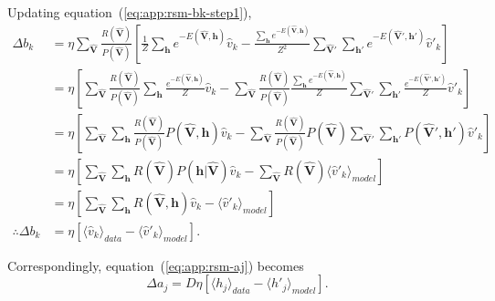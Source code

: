 Updating equation~(\ref{eq:app:rsm-bk-step1}),
\begin{align}
    \Delta b_{k} &= \eta \sum_{\mathbf{\hat{V}}} \frac{R(\mathbf{\hat{V}})}{P(\mathbf{\hat{V}})} \left[ \frac{1}{Z} \sum_{\mathbf{h}} e^{-E(\mathbf{\hat{V}}, \mathbf{h})} \hat{v}_{k} - \frac{\sum_{\mathbf{h}} e^{-E(\mathbf{\hat{V}}, \mathbf{h})}}{Z^{2}} \sum_{\mathbf{\hat{V}}'} \sum_{\mathbf{h}'} e^{-E(\mathbf{\hat{V}}', \mathbf{h}')} \hat{v}'_{k} \right] \nonumber \\%
    &= \eta \left[ \sum_{\mathbf{\hat{V}}} \frac{R(\mathbf{\hat{V}})}{P(\mathbf{\hat{V}})} \sum_{\mathbf{h}} \frac{e^{-E(\mathbf{\hat{V}}, \mathbf{h})}}{Z} \hat{v}_{k} - \sum_{\mathbf{\hat{V}}} \frac{R(\mathbf{\hat{V}})}{P(\mathbf{\hat{V}})} \frac{\sum_{\mathbf{h}} e^{-E(\mathbf{\hat{V}}, \mathbf{h})}}{Z} \sum_{\mathbf{\hat{V}}'} \sum_{\mathbf{h}'} \frac{e^{-E(\mathbf{\hat{V}}', \mathbf{h}')}}{Z} \hat{v}'_{k} \right] \nonumber \\%
    &= \eta \left[ \sum_{\mathbf{\hat{V}}} \sum_{\mathbf{h}} \frac{R(\mathbf{\hat{V}})}{P(\mathbf{\hat{V}})} P(\mathbf{\hat{V}}, \mathbf{h}) \hat{v}_{k} - \sum_{\mathbf{\hat{V}}} \frac{R(\mathbf{\hat{V}})}{P(\mathbf{\hat{V}})} P(\mathbf{\hat{V}}) \sum_{\mathbf{\hat{V}}'} \sum_{\mathbf{h}'} P(\mathbf{\hat{V}}', \mathbf{h}') \hat{v}'_{k} \right] \nonumber \\%
    &= \eta \left[ \sum_{\mathbf{\hat{V}}} \sum_{\mathbf{h}} R(\mathbf{\hat{V}}) P(\mathbf{h}| \mathbf{\hat{V}}) \hat{v}_{k} - \sum_{\mathbf{\hat{V}}} R(\mathbf{\hat{V}}) \langle \hat{v}'_{k} \rangle_{model} \right] \nonumber \\%
    &= \eta \left[ \sum_{\mathbf{\hat{V}}} \sum_{\mathbf{h}} R(\mathbf{\hat{V}}, \mathbf{h}) \hat{v}_{k} - \langle \hat{v}'_{k} \rangle_{model} \right] \nonumber \\%
    \label{eq:app:rsm-bk-final}
    \therefore \Delta b_{k} &= \eta \left[ \langle \hat{v}_{k} \rangle_{data} - \langle \hat{v}'_{k} \rangle_{model} \right].
\end{align}

Correspondingly, equation~(\ref{eq:app:rsm-aj}) becomes
\begin{equation}
    \label{eq:app:rsm-aj-final}
    \Delta a_{j} = D \eta \left[ \langle h_{j} \rangle_{data} - \langle h'_{j} \rangle_{model} \right].
\end{equation}







 

